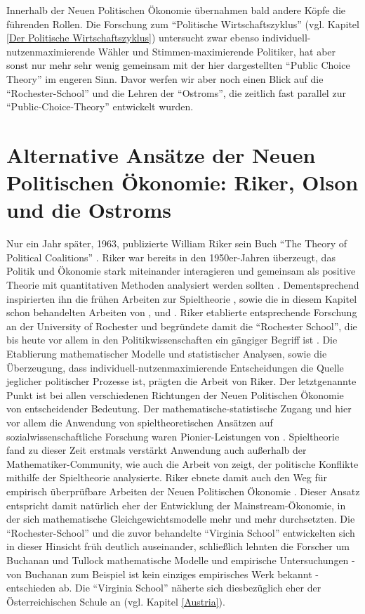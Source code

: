 Innerhalb der Neuen Politischen Ökonomie übernahmen bald andere Köpfe die führenden Rollen. Die Forschung zum "`Politische Wirtschaftszyklus"' (vgl. Kapitel \ref{Der Politische Wirtschaftszyklus}) untersucht zwar ebenso individuell-nutzenmaximierende Wähler und Stimmen-maximierende Politiker, hat aber sonst nur mehr sehr wenig gemeinsam mit der hier dargestellten "`Public Choice Theory"' im engeren Sinn. Davor werfen wir aber noch einen Blick auf die "`Rochester-School"' und die Lehren der "`Ostroms"', die zeitlich fast parallel zur "`Public-Choice-Theory"' entwickelt wurden.

\section{Alternative Ansätze der Neuen Politischen Ökonomie: Riker, Olson und die Ostroms }

Nur ein Jahr später, 1963, publizierte William Riker sein Buch "`The Theory of Political Coalitions"' \parencite{Riker1962}. Riker war bereits in den 1950er-Jahren überzeugt, das Politik und Ökonomie stark miteinander interagieren und gemeinsam als positive Theorie mit quantitativen Methoden analysiert werden sollten \parencite[S. 205]{Maske2003}. Dementsprechend inspirierten ihn die frühen Arbeiten zur Spieltheorie \parencite{Morgenstern1944}, sowie die in diesem Kapitel schon behandelten Arbeiten von \textcite{Downs1957b}, \textcite{Black1948a} und \textcite{Arrow1951} \parencite[S. 205]{Maske2003}. Riker etablierte entsprechende Forschung an der University of Rochester und begründete damit die "`Rochester School"', die bis heute vor allem in den Politikwissenschaften ein gängiger Begriff ist \parencite[S. 270]{Amadae1999}. Die Etablierung mathematischer Modelle und statistischer Analysen, sowie die Überzeugung, dass individuell-nutzenmaximierende Entscheidungen die Quelle jeglicher politischer Prozesse ist, prägten die Arbeit von Riker. Der letztgenannte Punkt ist bei allen verschiedenen Richtungen der Neuen Politischen Ökonomie von entscheidender Bedeutung. Der mathematische-statistische Zugang und hier vor allem die Anwendung von spieltheoretischen Ansätzen auf sozialwissenschaftliche Forschung waren Pionier-Leistungen von \textcite{Riker1962} \parencite[S. 210]{Maske2003}. Spieltheorie fand zu dieser Zeit erstmals verstärkt Anwendung auch außerhalb der Mathematiker-Community, wie auch die Arbeit von \textcite{Schelling1960} zeigt, der politische Konflikte mithilfe der Spieltheorie analysierte. Riker ebnete damit auch den Weg für empirisch überprüfbare Arbeiten der Neuen Politischen Ökonomie \parencite[S. 270]{Amadae1999}. Dieser Ansatz entspricht damit natürlich eher der Entwicklung der Mainstream-Ökonomie, in der sich mathematische Gleichgewichtsmodelle mehr und mehr durchsetzten. Die "`Rochester-School"' und die zuvor behandelte "`Virginia School"' entwickelten sich in dieser Hinsicht früh deutlich auseinander, schließlich lehnten die Forscher um Buchanan und Tullock mathematische Modelle und empirische Untersuchungen - von Buchanan zum Beispiel ist kein einziges empirisches Werk bekannt \parencite[S. 178]{Romer1988} - entschieden ab. Die "`Virginia School"' näherte sich diesbezüglich eher der Österreichischen Schule an (vgl. Kapitel \ref{Austria}).

